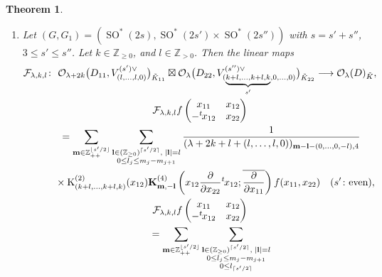 \documentclass[pdftex]{sigma}
\numberwithin{equation}{section}
\newtheorem{Theorem}{Theorem}[section]
\newcommand{\bK}{\mathbf{K}}
\newcommand{\bl}{\mathbf{l}}
\newcommand{\bm}{\mathbf{m}}
\newcommand{\BZ}{\mathbb{Z}}
\newcommand{\fg}{\mathfrak{g}}
\newcommand{\cF}{\mathcal{F}}
\newcommand{\cO}{\mathcal{O}}
\newcommand{\rK}{\mathrm{K}}
\begin{document}
\begin{Theorem}
\begin{enumerate}
\begin{gather*}
\overline{\frac{\partial}{\partial x_{11}}}\right)f(x_{11},x_{22})
\end{gather*}
intertwines the $(\fg_1,\tilde{K}_1)$-action. Here we identify $\bm=(m_1,\ldots,m_{\lfloor s'/2\rfloor})\in\BZ_{++}^{\lfloor s'/2\rfloor}$
with $(m_1,\ldots,m_{\lfloor s'/2\rfloor},0)\in\BZ_{++}^{\lceil s'/2\rceil}$ when $s'$ is odd.
If $s'=s''$ or $k=0$ or ``$s''=s'+1$ and $l=0$''
or $\lambda>2s''-3$ or ``$s''=s'+1$ and $\lambda+k>2s''-3$'',
then this extends to the map between the spaces of all holomorphic functions.
\item[$(4)$] Let $(G,G_1)=(\operatorname{SO}^*(2s), \operatorname{SO}^*(2s')\times \operatorname{SO}^*(2s''))$ with $s=s'+s''$, $3\le s'\le s''$.
Let $k\in\BZ_{\ge 0}$, and $l\in\BZ_{>0}$. Then the linear maps
\begin{gather*}
\cF_{\lambda,k,l}\colon \ \cO_{\lambda+2k}\big(D_{11},V_{(l,\ldots,l,0)}^{(s')\vee}\big)_{\tilde{K}_{11}}\boxtimes
\cO_\lambda\big(D_{22},V_{(\underbrace{\scriptstyle k+l,\ldots,k+l,k}_{s'},0,\ldots,0)}^{(s'')\vee}\big)_{\tilde{K}_{22}}
\longrightarrow \cO_\lambda(D)_{\tilde{K}}, \\
\cF_{\lambda,k,l}f\begin{pmatrix}x_{11}&x_{12}\\-{}^t\hspace{-1pt}x_{12}&x_{22}\end{pmatrix} \\
\qquad{} =\sum_{\bm\in\BZ_{++}^{\lfloor s'/2\rfloor}}\sum_{\substack{\bl\in(\BZ_{\ge 0})^{\lceil s'/2\rceil},\; |\bl|=l\\ 0\le l_j\le m_j-m_{j+1}}}
\frac{1}{(\lambda+2k+l+(l,\ldots,l,0))_{\bm-\bl-(0,\ldots,0,-l),4}}\\
\qquad\quad{} \times \rK_{(k+l,\ldots,k+l,k)}^{(2)}(x_{12})
\bK_{\bm,-\bl}^{(4)}\left(x_{12}\frac{\partial}{\partial x_{22}}{}^t\hspace{-1pt}x_{12};
\overline{\frac{\partial}{\partial x_{11}}}\right)f(x_{11},x_{22}) \quad (s'\colon \text{even}),\\
\cF_{\lambda,k,l}f\begin{pmatrix}x_{11}&x_{12}\\-{}^t\hspace{-1pt}x_{12}&x_{22}\end{pmatrix} \\
\qquad{} =\sum_{\bm\in\BZ_{++}^{\lfloor s'/2\rfloor}}
\sum_{\substack{\bl\in(\BZ_{\ge 0})^{\lceil s'/2\rceil},\; |\bl|=l\\ 0\le l_j\le m_j-m_{j+1}\\ 0\le l_{\lceil s'/2\rceil}}}

\end{gather*}
\end{enumerate}
\end{Theorem}
\end{document}
